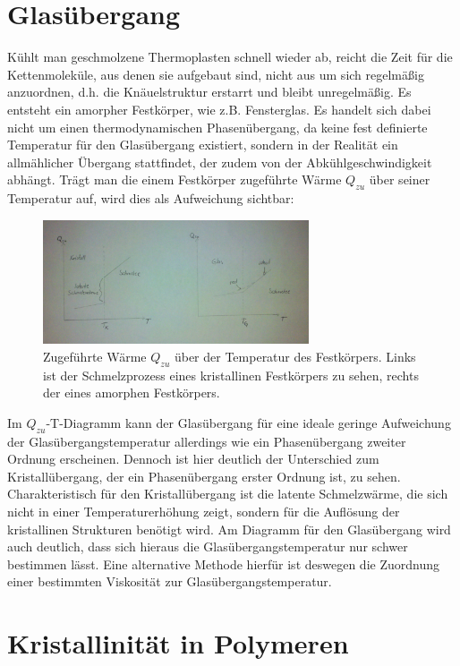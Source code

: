 \documentclass[bigchapter,colorback,accentcolor=tud4b,linedtoc,11pt]{tudreport}
\begin{document}
\section{Glasübergang}

Kühlt man geschmolzene Thermoplasten schnell wieder ab, reicht die Zeit für die Kettenmoleküle, aus denen sie aufgebaut sind, nicht aus um sich regelmäßig anzuordnen, d.h. die Knäuelstruktur erstarrt und bleibt unregelmäßig. Es entsteht ein amorpher Festkörper, wie z.B. Fensterglas. Es handelt sich dabei nicht um einen thermodynamischen Phasenübergang, da keine fest definierte Temperatur für den Glasübergang existiert, sondern in der Realität ein allmählicher Übergang stattfindet, der zudem von der Abkühlgeschwindigkeit abhängt. Trägt man die einem Festkörper zugeführte Wärme $Q_{zu}$ über seiner Temperatur auf, wird dies als Aufweichung sichtbar:


\begin{figure}[h] 
  \centering
     \includegraphics[width=0.7\textwidth]{data/glastemperatur.jpg}
  \caption{Zugeführte Wärme $Q_{zu}$ über der Temperatur des Festkörpers. Links ist der Schmelzprozess eines kristallinen Festkörpers zu sehen, rechts der eines amorphen Festkörpers.}
  \label{fig:Bild1}
\end{figure}

Im $Q_{zu}$-T-Diagramm kann der Glasübergang für eine ideale geringe Aufweichung der Glasübergangstemperatur allerdings wie ein Phasenübergang zweiter Ordnung erscheinen. Dennoch ist hier deutlich der Unterschied zum Kristallübergang, der ein Phasenübergang erster Ordnung ist, zu sehen. Charakteristisch für den Kristallübergang ist die latente Schmelzwärme, die sich nicht in einer Temperaturerhöhung zeigt, sondern für die Auflösung der kristallinen Strukturen benötigt wird. Am Diagramm für den Glasübergang wird auch deutlich, dass sich hieraus die Glasübergangstemperatur nur schwer bestimmen lässt. Eine alternative Methode hierfür ist deswegen die Zuordnung einer bestimmten Viskosität zur Glasübergangstemperatur.

\section{Kristallinität in Polymeren}
\end{document}
